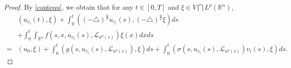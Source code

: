 \documentclass[10pt,a4paper]{amsart}
\begin{document}
\begin{proof}
    By \eqref{contequ}, we obtain that for any
    $t\in [0,T]$ and
    $\xi \in  V \bigcap L^p(\mathbb{R}^n)$,
    \begin{align} \label{sc-12}
        & \left( u_{v_i} (t), \xi \right)
        + \int_0^t
        \left( (-\triangle)^{\frac{\alpha}{2}} u_{v_i}(s),
        (-\triangle)^{\frac{\alpha}{2}} \xi
        \right) ds
        \nonumber \\
        & + \int_0^t \int_{\mathbb{R}^n} f( s, x, u_{v_i}(s), \mathcal{L}_{u^0(s)} ) \xi(x) dx ds
        \nonumber\\
        = & \left(u_0, \xi\right)
        + \int_0^t \left( g(s, u_{v_i}(s), \mathcal{L}_{u^0(s)} ), \xi \right) ds
        + \int_0^t \left( \sigma(s, u_{v_i}(s), \mathcal{L}_{u^0(s)} ) v_i(s), \xi \right) ds.
    \end{align}



\end{proof}
\end{document}
